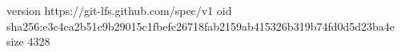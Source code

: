 version https://git-lfs.github.com/spec/v1
oid sha256:e3c4ca2b51c9b29015c1fbefc26718fab2159ab415326b319b74fd0d5d23ba4e
size 4328
